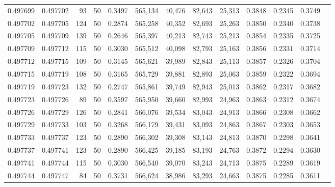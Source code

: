 \begin{tabular}{rrrrrrrrrrrrr}
0.497699 & 0.497702 &    93 &  50 &                                     0.3497 & 565,134 &  40,476 &  82,643 &  25,313 & 0.3848 & 0.2345 & 0.3749 \\
0.497702 & 0.497705 &   124 &  50 &                                     0.2874 & 565,258 &  40,352 &  82,693 &  25,263 & 0.3850 & 0.2340 & 0.3738 \\
0.497705 & 0.497709 &   139 &  50 &                                     0.2646 & 565,397 &  40,213 &  82,743 &  25,213 & 0.3854 & 0.2335 & 0.3725 \\
0.497709 & 0.497712 &   115 &  50 &                                     0.3030 & 565,512 &  40,098 &  82,793 &  25,163 & 0.3856 & 0.2331 & 0.3714 \\
0.497712 & 0.497715 &   109 &  50 &                                     0.3145 & 565,621 &  39,989 &  82,843 &  25,113 & 0.3857 & 0.2326 & 0.3704 \\
0.497715 & 0.497719 &   108 &  50 &                                     0.3165 & 565,729 &  39,881 &  82,893 &  25,063 & 0.3859 & 0.2322 & 0.3694 \\
0.497719 & 0.497723 &   132 &  50 &                                     0.2747 & 565,861 &  39,749 &  82,943 &  25,013 & 0.3862 & 0.2317 & 0.3682 \\
0.497723 & 0.497726 &    89 &  50 &                                     0.3597 & 565,950 &  39,660 &  82,993 &  24,963 & 0.3863 & 0.2312 & 0.3674 \\
0.497726 & 0.497729 &   126 &  50 &                                     0.2841 & 566,076 &  39,534 &  83,043 &  24,913 & 0.3866 & 0.2308 & 0.3662 \\
0.497729 & 0.497733 &   103 &  50 &                                     0.3268 & 566,179 &  39,431 &  83,093 &  24,863 & 0.3867 & 0.2303 & 0.3653 \\
0.497733 & 0.497737 &   123 &  50 &                                     0.2890 & 566,302 &  39,308 &  83,143 &  24,813 & 0.3870 & 0.2298 & 0.3641 \\
0.497737 & 0.497741 &   123 &  50 &                                     0.2890 & 566,425 &  39,185 &  83,193 &  24,763 & 0.3872 & 0.2294 & 0.3630 \\
0.497741 & 0.497744 &   115 &  50 &                                     0.3030 & 566,540 &  39,070 &  83,243 &  24,713 & 0.3875 & 0.2289 & 0.3619 \\
0.497744 & 0.497747 &    84 &  50 &                                     0.3731 & 566,624 &  38,986 &  83,293 &  24,663 & 0.3875 & 0.2285 & 0.3611 \\

\end{tabular}
